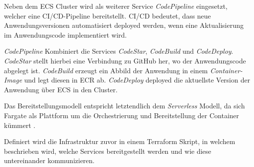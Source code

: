 Neben dem \ac{ECS} Cluster wird als weiterer Service \textit{\gls{CodePipeline}} eingesetzt, welcher eine \ac{CI/CD}-Pipeline bereitstellt. \ac{CI/CD} bedeutet, dass neue Anwendungsversionen automatisiert deployed werden, wenn eine Aktualisierung im Anwendungscode implementiert wird. 

\textit{\gls{CodePipeline}} Kombiniert die Services \textit{CodeStar}, \textit{CodeBuild} und \textit{CodeDeploy}. \textit{CodeStar} stellt hierbei eine Verbindung zu \gls{GitHub} her, wo der Anwendungscode abgelegt ist. \textit{CodeBuild} erzeugt ein Abbild der Anwendung in einem \textit{Container-Image} und legt diesen in \ac{ECR} ab. \textit{CodeDeploy} deployed die aktuellste Version der Anwendung über \ac{ECS} in den Cluster.


Das Bereitstellungsmodell entspricht letztendlich dem \textit{Serverless} Modell, da sich \gls{Fargate} als Plattform um die Orchestrierung und Bereitstellung der Container kümmert \cite[Vgl.][]{AWSFargate}\cite[Vgl][S. 16]{CNCF2018}.

Definiert wird die Infrastruktur zuvor in einem \gls{Terraform} Skript, in welchem beschrieben wird, welche Services bereitgestellt werden und wie diese untereinander kommunizieren.